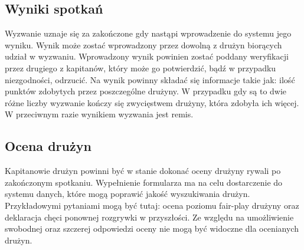 \subsection{Wyniki spotkań}

Wyzwanie uznaje się za zakończone gdy nastąpi wprowadzenie do systemu jego wyniku. Wynik może zostać wprowadzony przez dowolną z drużyn biorących udział w wyzwaniu. Wprowadzony wynik powinien zostać poddany weryfikacji przez drugiego z kapitanów, który może go potwierdzić, bądź w przypadku niezgodności, odrzucić. Na wynik powinny składać się informacje takie jak: ilość punktów zdobytych przez poszczególne drużyny. W przypadku gdy są to dwie różne liczby wyzwanie kończy się zwycięstwem drużyny, która zdobyła ich więcej. W przeciwnym razie wynikiem wyzwania jest remis.

\subsection{Ocena drużyn}

Kapitanowie drużyn powinni być w stanie dokonać oceny drużyny rywali po zakończonym spotkaniu. Wypełnienie formularza ma na celu dostarczenie do systemu danych, które mogą poprawić jakość wyszukiwania drużyn. Przykładowymi pytaniami mogą być tutaj: ocena poziomu fair-play drużyny oraz deklaracja chęci ponownej rozgrywki w przyszłości. Ze względu na umożliwienie swobodnej oraz szczerej odpowiedzi oceny nie mogą być widoczne dla ocenianych drużyn.
